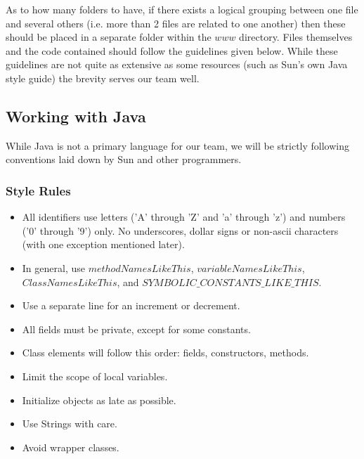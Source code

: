 \documentclass[12pt]{article}
\begin{document}
As to how many folders to have, if there exists a logical grouping between one file and several others (i.e. more than 2 files are related to one another) then these should be placed in a separate folder within the $www$ directory.  Files themselves and the code contained should follow the guidelines given below.  While these guidelines are not quite as extensive as some resources (such as Sun's own Java style guide\cite{JavaStyle-Sun}) the brevity serves our team well.



\subsection{Working with Java}

While Java is not a primary language for our team, we will be strictly following conventions laid down by Sun and other programmers\cite{JavaStyle-Sun}\cite{JavaStyle-JavaRanch}.



\subsubsection{Style Rules}

\begin{itemize}

\item All identifiers use letters ('A' through 'Z' and 'a' through 'z') and numbers ('0' through '9') only. No underscores, dollar signs or non-ascii characters (with one exception mentioned later).

\item In general, use $methodNamesLikeThis$, $variableNamesLikeThis$, $ClassNamesLikeThis$, and $SYMBOLIC\_CONSTANTS\_LIKE\_THIS$.

\item Use a separate line for an increment or decrement.

\item All fields must be private, except for some constants.

\item Class elements will follow this order: fields, constructors, methods.

\item Limit the scope of local variables.

\item Initialize objects as late as possible.

\item Use Strings with care.

\item Avoid wrapper classes.

\end{itemize}
\end{document}
